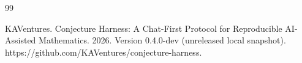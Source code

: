 \begin{thebibliography}{99}
\raggedright
{} KAVentures. Conjecture Harness: A Chat-First Protocol for Reproducible AI-Assisted Mathematics. 2026. Version 0.4.0-dev (unreleased local snapshot). https://github.com/KAVentures/conjecture-harness.
\end{thebibliography}
